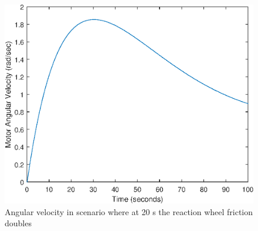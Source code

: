 \begin{figure}
	\centering
	\includegraphics[width=120mm]{figures/omega_Noreconfig}
	\caption{Angular velocity in scenario where at 20 s the reaction wheel friction doubles}
	\label{fig:residualOmega}
\end{figure} 


%
%
%
%
%
%
%
%
%
%
